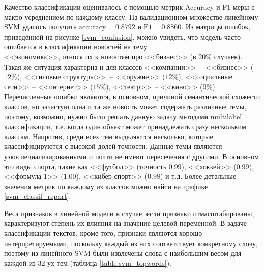 \documentclass[a4paper, 14pt]{extarticle}
\begin{document}
Качество классификации оценивалось с помощью метрик Accuracy и F1-меры с макро-усреднением по каждому классу.
На валидационном множестве линейному SVM удалось получить $\text{accuracy} = 0.8792$ и $\text{F1} = 0.8860$. Из матрицы ошибок,
приведённой на рисунке \ref{svm_confusion}, можно увидеть, что модель часто ошибается в классификации новостей на тему \\
<<экономика>>, относя их к новостям про <<бизнес>> (в $20\%$ случаев). Такая же ситуация характерна и для классов <<компании>>~-- 
<<бизнес>> ($12\%$), <<силовые структуры>>~-- <<оружие>> ($12\%$),  <<социальные сети>>~-- <<интернет>> ($15\%$), <<театр>>~-- 
<<кино>> ($9\%$). Перечисленные ошибки являются, в основном, причиной семантической схожести классов, но зачастую одна и та же 
новость может содержать различные темы, поэтому, возможно, нужно было решать данную задачу методами multilabel классификации, т.е. 
когда один объект может принадлежать сразу
нескольким классам. Напротив, среди всех тем выделяются несколько, которые классифицируются с высокой долей точности. Данные темы 
являются узкоспециализированными и почти не имеют пересечения с другими. В основном это виды спорта, такие как <<футбол>> (точность 
$0.99$), <<хоккей>> ($0.99$), <<формула-1>> ($1.00$), <<кибер-спорт>> ($0.98$) и т.д. Более детальные
значения метрик по каждому из классов можно найти на графике \ref{svm_classif_report}.

Веса признаков в линейной модели в случае, если признаки отмасштабированы, характеризуют степень их влияния на значение целевой 
переменной. В задаче классификации текстов, кроме того, признаки являются хорошо интерпретируемыми, поскольку каждый из них 
соответствует конкретному слову, поэтому из линейного SVM были извлечены слова с наибольшим весом для каждой из 32-ух тем (таблица \ref{table:svm_topwords}). 
%
%
%
%
%
%
%
%
\end{document}
